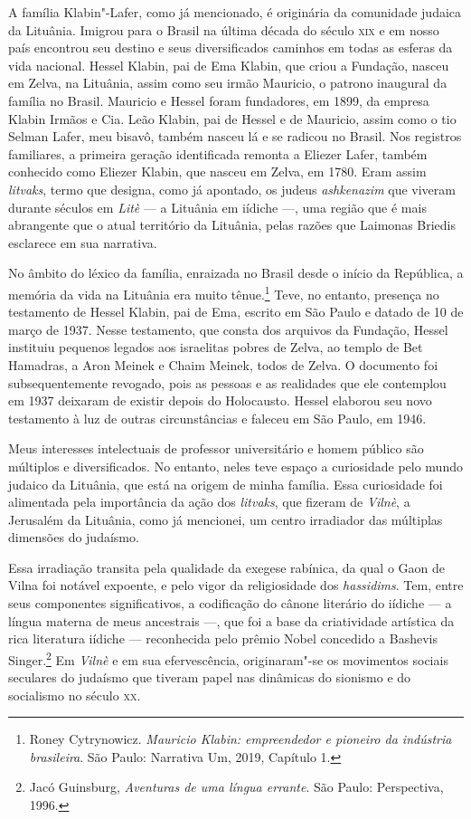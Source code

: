 A família Klabin"-Lafer, como já mencionado, é originária da comunidade
judaica da Lituânia. Imigrou para o Brasil na última década do século
\textsc{xix} e em nosso país encontrou seu destino e seus diversificados caminhos
em todas as esferas da vida nacional. Hessel Klabin, pai de Ema Klabin,
que criou a Fundação, nasceu em Zelva, na Lituânia, assim como seu irmão
Mauricio, o patrono inaugural da família no Brasil. Mauricio e Hessel
foram fundadores, em 1899, da empresa Klabin Irmãos e Cia. Leão Klabin,
pai de Hessel e de Mauricio, assim como o tio Selman Lafer, meu bisavô,
também nasceu lá e se radicou no Brasil. Nos registros familiares, a
primeira geração identificada remonta a Eliezer Lafer, também conhecido
como Eliezer Klabin, que nasceu em Zelva, em 1780. Eram assim
\textit{litvaks}, termo que designa, como já apontado, os judeus
\textit{ashkenazim} que viveram durante séculos em \textit{Litè} --- a Lituânia em
iídiche ---, uma região que é mais abrangente que o atual território da
Lituânia, pelas razões que Laimonas Briedis esclarece em sua narrativa.

No âmbito do léxico da família, enraizada no Brasil desde o início da
República, a memória da vida na Lituânia era muito tênue.\footnote{Roney Cytrynowicz. 
\textit{Mauricio Klabin: empreendedor e pioneiro da indústria brasileira}. São Paulo: Narrativa 
Um, 2019, Capítulo 1.} Teve, no entanto, presença no testamento de
Hessel Klabin, pai de Ema, escrito em São Paulo e datado de 10 de março
de 1937. Nesse testamento, que consta dos arquivos da Fundação, Hessel
instituiu pequenos legados aos israelitas pobres de Zelva, ao templo de
Bet Hamadras, a Aron Meinek e Chaim Meinek, todos de Zelva. O documento
foi subsequentemente revogado, pois as pessoas e as realidades que ele
contemplou em 1937 deixaram de existir depois do Holocausto. Hessel
elaborou seu novo testamento à luz de outras circunstâncias e faleceu em
São Paulo, em 1946.

Meus interesses intelectuais de professor universitário e homem público
são múltiplos e diversificados. No entanto, neles teve espaço a
curiosidade pelo mundo judaico da Lituânia, que está na origem de minha
família. Essa curiosidade foi alimentada pela importância da ação dos
\textit{litvaks}, que fizeram de \textit{Vilnè}, a Jerusalém da Lituânia, como já
mencionei, um centro irradiador das múltiplas dimensões do judaísmo.

Essa irradiação transita pela qualidade da exegese rabínica, da qual o
Gaon de Vilna foi notável expoente, e pelo vigor da religiosidade dos
\textit{hassidims}. Tem, entre seus componentes significativos, a
codificação do cânone literário do iídiche --- a língua materna de meus
ancestrais ---, que foi a base da criatividade artística da rica
literatura iídiche --- reconhecida pelo prêmio Nobel concedido a Bashevis
Singer.\footnote{Jacó Guinsburg, \textit{Aventuras de uma língua
  errante}. São Paulo: Perspectiva, 1996.} Em \textit{Vilnè} e em sua
efervescência, originaram"-se os movimentos sociais seculares do judaísmo
que tiveram papel nas dinâmicas do sionismo e do socialismo no século
\textsc{xx}.

